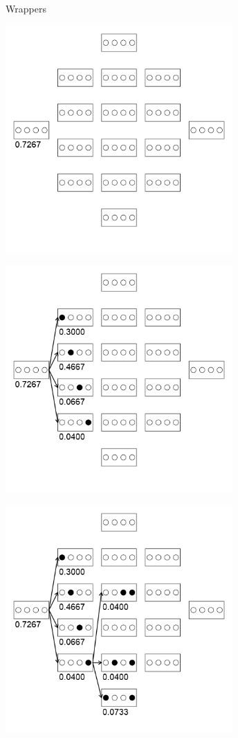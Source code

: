\begin{vbframe}{Wrappers}
\begin{center}
\includegraphics[width = 0.65\textwidth]{figure_man/wrapperanim2.png}
\end{center}

\framebreak

\begin{center}
\includegraphics[width = 0.65\textwidth]{figure_man/wrapperanim3.png}
\end{center}

\framebreak

\begin{center}
\includegraphics[width = 0.65\textwidth]{figure_man/wrapperanim4.png}
\end{center}


\end{vbframe}
